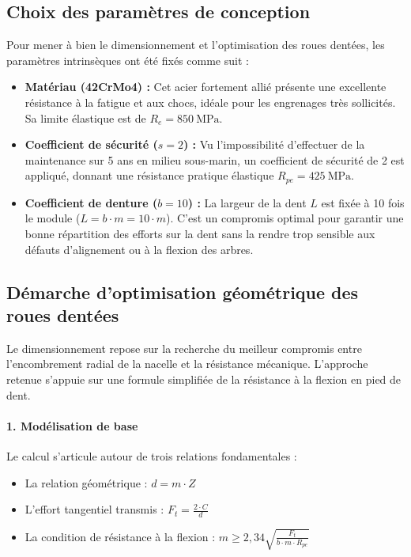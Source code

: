 \documentclass[11pt,a4paper]{article}
\begin{document}
\subsection{Choix des paramètres de conception}

Pour mener à bien le dimensionnement et l'optimisation des roues dentées, les paramètres intrinsèques ont été fixés comme suit :
\begin{itemize}
    \item \textbf{Matériau (42CrMo4) :} Cet acier fortement allié présente une excellente résistance à la fatigue et aux chocs, idéale pour les engrenages très sollicités. Sa limite élastique est de $R_e = \qty{850}{\mega\pascal}$.
    \item \textbf{Coefficient de sécurité ($s=2$) :} Vu l'impossibilité d'effectuer de la maintenance sur 5 ans en milieu sous-marin, un coefficient de sécurité de 2 est appliqué, donnant une résistance pratique élastique $R_{pe} = \qty{425}{\mega\pascal}$.
    \item \textbf{Coefficient de denture ($b=10$) :} La largeur de la dent $L$ est fixée à 10 fois le module ($L = b \cdot m = 10 \cdot m$). C'est un compromis optimal pour garantir une bonne répartition des efforts sur la dent sans la rendre trop sensible aux défauts d'alignement ou à la flexion des arbres.
\end{itemize}

\subsection{Démarche d'optimisation géométrique des roues dentées}

Le dimensionnement repose sur la recherche du meilleur compromis entre l'encombrement radial de la nacelle et la résistance mécanique. L'approche retenue s'appuie sur une formule simplifiée de la résistance à la flexion en pied de dent.

\paragraph{1. Modélisation de base}
Le calcul s'articule autour de trois relations fondamentales :
\begin{itemize}
    \item La relation géométrique : $d = m \cdot Z$
    \item L'effort tangentiel transmis : $F_t = \frac{2 \cdot C}{d}$
    \item La condition de résistance à la flexion : $m \ge 2{,}34 \sqrt{\frac{F_t}{b \cdot m \cdot R_{pe}}}$
\end{itemize}
\end{document}
